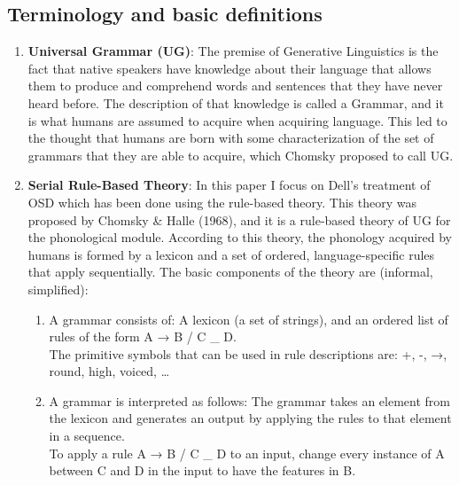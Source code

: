 \documentclass{article}
\begin{document}
\subsection{Terminology and basic definitions} %
\begin{enumerate}

  \item \textbf{Universal Grammar (UG)}: The premise of Generative Linguistics is the fact that native speakers have knowledge about
their language that allows them to produce and comprehend words and sentences that they have never heard before. The description of that knowledge is called a Grammar, and it is what humans are assumed to acquire when acquiring language. This led to the thought that humans are born with some characterization of the set of grammars that they are able to acquire,  which Chomsky proposed to call UG.
  \item \textbf{Serial Rule-Based Theory}: In this paper I focus on Dell's treatment of OSD which has been done using the rule-based theory. This theory was proposed by Chomsky \& Halle (1968),  and it is a rule-based theory of UG for the phonological module.  According to this theory, the phonology acquired by humans is formed by a lexicon and a set of ordered, language-specific rules that apply sequentially. The basic components of the theory are (informal,  simplified):
\begin{enumerate}
  \item A grammar consists of: A lexicon (a set of strings), and an ordered list of rules of the form A → B / C \_ D. \\ The primitive symbols that can be used in rule descriptions are: +, -, →,
round, high, voiced, …
 \item A grammar is interpreted as follows: The grammar takes an element from the lexicon and generates an output by
applying the rules to that element in a sequence.\\
To apply a rule A → B / C \_ D to an input, change every instance of A between C and D in the input to have the features in B.
\end{enumerate}


\end{enumerate}
\end{document}
